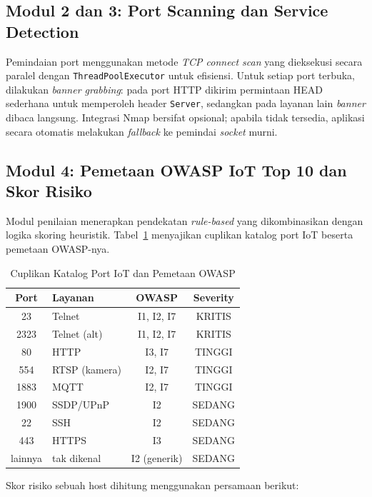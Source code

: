 \documentclass[conference]{IEEEtran}
\begin{document}
\subsection{Modul 2 dan 3: Port Scanning dan Service Detection}

Pemindaian port menggunakan metode \textit{TCP connect scan} yang dieksekusi secara paralel dengan \texttt{ThreadPoolExecutor} untuk efisiensi. Untuk setiap port terbuka, dilakukan \textit{banner grabbing}: pada port HTTP dikirim permintaan HEAD sederhana untuk memperoleh header \texttt{Server}, sedangkan pada layanan lain \textit{banner} dibaca langsung. Integrasi Nmap bersifat opsional; apabila tidak tersedia, aplikasi secara otomatis melakukan \textit{fallback} ke pemindai \textit{socket} murni.

\subsection{Modul 4: Pemetaan OWASP IoT Top 10 dan Skor Risiko}

Modul penilaian menerapkan pendekatan \textit{rule-based} yang dikombinasikan dengan logika skoring heuristik. Tabel\ \ref{tab:port_catalog} menyajikan cuplikan katalog port IoT beserta pemetaan OWASP-nya.

\begin{table}[htbp]
\caption{Cuplikan Katalog Port IoT dan Pemetaan OWASP}
\label{tab:port_catalog}
\renewcommand{\arraystretch}{1.2}
\begin{tabular}{|c|l|c|c|}
\hline
\textbf{Port} & \textbf{Layanan} & \textbf{OWASP} & \textbf{Severity} \\
\hline
23 & Telnet & I1, I2, I7 & KRITIS \\
\hline
2323 & Telnet (alt) & I1, I2, I7 & KRITIS \\
\hline
80 & HTTP & I3, I7 & TINGGI \\
\hline
554 & RTSP (kamera) & I2, I7 & TINGGI \\
\hline
1883 & MQTT & I2, I7 & TINGGI \\
\hline
1900 & SSDP/UPnP & I2 & SEDANG \\
\hline
22 & SSH & I2 & SEDANG \\
\hline
443 & HTTPS & I3 & SEDANG \\
\hline
lainnya & tak dikenal & I2 (generik) & SEDANG \\
\hline
\end{tabular}
\end{table}

Skor risiko sebuah host dihitung menggunakan persamaan berikut:
\end{document}
